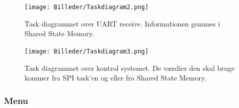 \begin{figure}[ht]
			\begin{center}
\texttt{[image: Billeder/Taskdiagram2.png]}
			\end{center}
	\caption{Task diagrammet over UART receive. Informationen gemmes i Shared State Memory.}
	\label{fig:task2}
\end{figure}

\begin{figure}[ht]
			\begin{center}
\texttt{[image: Billeder/Taskdiagram3.png]}
			\end{center}
	\caption{Task diagrammet over kontrol systemet. De værdier den skal bruge kommer fra SPI task'en og eller fra Shared State Memory.}
	\label{fig:task3}
\end{figure}



\subsubsection{Menu}

